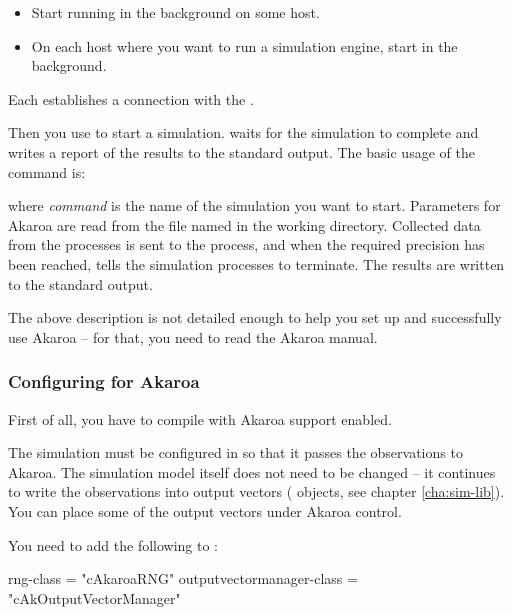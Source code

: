 \begin{itemize}
  \item Start  running in the background on some host.
  \item On each host where you want to run a simulation engine,
     start  in the background.
\end{itemize}

Each  establishes a connection with the .

Then you use  to start a simulation.  waits
for the simulation to complete and writes a report of the results
to the standard output. The basic usage of the  command is:


where \textit{command} is the name of the simulation you want to start.
Parameters for Akaroa are read from the file named  in
the working directory. Collected data from the processes is
sent to the  process, and when the required precision
has been reached,  tells the simulation processes to
terminate. The results are written to the standard output.

The above description is not detailed enough to help you
set up and successfully use Akaroa -- for that, you need to read the
Akaroa manual.

\subsubsection{Configuring {\opp} for Akaroa}
\label{sec:run-sim:configuring-akaroa}

First of all, you have to compile {\opp} with Akaroa support enabled.

The {\opp} simulation must be configured in 
so that it passes the observations to Akaroa. The simulation model itself does
not need to be changed -- it continues to write
the observations into output vectors ( objects,
see chapter \ref{cha:sim-lib}). You can place some of
the output vectors under Akaroa control.

You need to add the following to :

\begin{inifile}
[General]
rng-class = "cAkaroaRNG"
outputvectormanager-class = "cAkOutputVectorManager"
\end{inifile}

